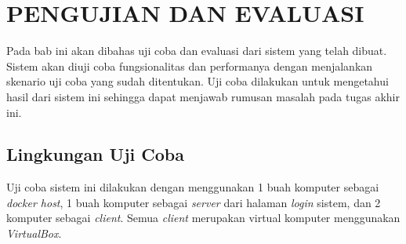 \chapter{PENGUJIAN DAN EVALUASI}
	Pada bab ini akan dibahas uji coba dan evaluasi dari sistem yang telah dibuat. Sistem akan diuji coba fungsionalitas dan performanya dengan menjalankan skenario uji coba yang sudah ditentukan. Uji coba dilakukan untuk mengetahui hasil dari sistem ini sehingga dapat menjawab rumusan masalah pada tugas akhir ini.    
    \section{Lingkungan Uji Coba}
    Uji coba sistem ini dilakukan dengan menggunakan 1 buah komputer sebagai \textit{docker host}, 1 buah komputer sebagai \textit{server} dari halaman \textit{login} sistem, dan 2 komputer sebagai \textit{client}. Semua \textit{client} merupakan virtual komputer menggunakan \textit{VirtualBox}.

